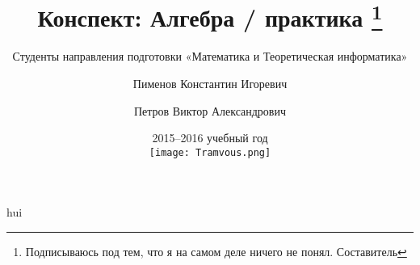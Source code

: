 \documentclass[a4paper,titlepage]{article}
\author{Студенты направления подготовки «Математика и Теоретическая информатика»
  \and Пименов Константин Игоревич
  \and Петров Виктор Александрович}
\title{Конспект: Алгебра / практика
  \thanks{Подписываюсь под тем, что я на самом деле ничего не понял. Составитель}}
\date{2015--2016 учебный год \\ \vspace{1.3cm}
\texttt{[image: Tramvous.png]}}
\begin{document}
\maketitle

\tableofcontents
\vfill\eject
hui














\end{document}
